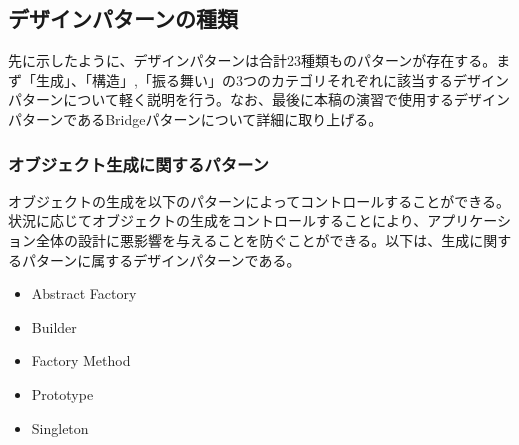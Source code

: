 \documentclass[dvipdfmx]{jsarticle}
\begin{document}
\subsection{デザインパターンの種類}
先に示したように、デザインパターンは合計23種類ものパターンが存在する。まず「生成」、「構造」,「振る舞い」の3つのカテゴリそれぞれに該当するデザインパターンについて軽く説明を行う。なお、最後に本稿の演習で使用するデザインパターンであるBridgeパターンについて詳細に取り上げる。
\subsubsection{オブジェクト生成に関するパターン}
オブジェクトの生成を以下のパターンによってコントロールすることができる。状況に応じてオブジェクトの生成をコントロールすることにより、アプリケーション全体の設計に悪影響を与えることを防ぐことができる。以下は、生成に関するパターンに属するデザインパターンである。
\begin{itemize}
  \item Abstract Factory
  \item Builder
  \item Factory Method
  \item Prototype
  \item Singleton
\end{itemize}
\end{document}
